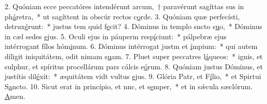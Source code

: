 2. Quóniam ecce peccatóres intendérunt arcum,~† paravérunt sagíttas sus in ph\uline{á}retra,~* ut sagíttent in obscúr rectos c\uline{o}rde.
3. Quóniam quæ perfecísti, dstrux\uline{é}runt:~* justus tem quid f\uline{e}cit?
4. Dóminus in templo sncto s\uline{u}o,~* Dóminus in cæl sedes \uline{e}jus.
5. Oculi ejus in páuperm resp\uline{í}ciunt:~* pálpebræ ejus intérrogant fílos hóm\uline{i}num.
6. Dóminus intérrogat justm et \uline{í}mpium:~* qui autem díligit iniquitátem, odit nimam s\uline{u}am.
7. Pluet super peccatres l\uline{á}queos:~* ignis, et sulphur, et spíritus procellárum pars cálcis e\uline{ó}rum.
8. Quóniam justus Dóminus, et justítis dil\uline{é}xit:~* æquitátem vidt vultus \uline{e}jus.
9. Glória Patr, et F\uline{í}lio,~* et Spirtui S\uline{a}ncto.
10. Sicut erat in princípio, et nnc, et s\uline{e}mper,~* et in sǽcula sæclórum. \uline{A}men.
